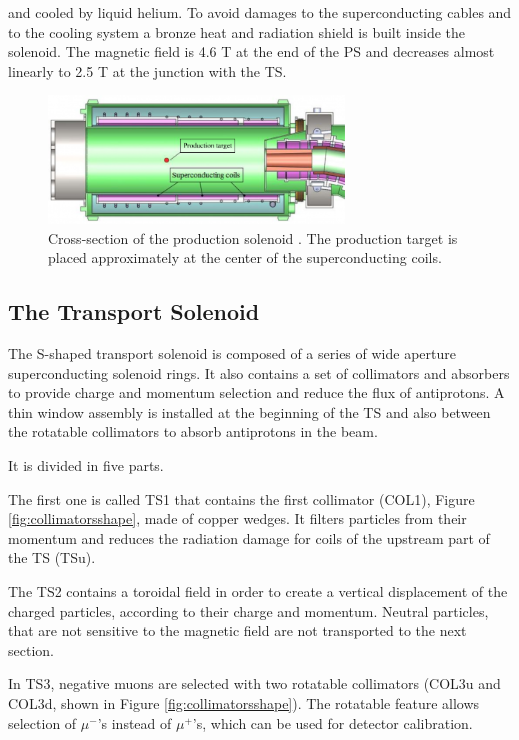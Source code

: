 and cooled by liquid helium. To avoid damages to the superconducting cables and
to the cooling system a bronze heat and radiation shield is built inside the solenoid.
The magnetic field is 4.6 T at the end of the PS and decreases almost linearly to 2.5 T at the
junction with the TS.
\begin{figure}[!h]
    \centering
    \includegraphics[width =0.7\textwidth]{figures/png/800px-Production_solenoid.png}
    \caption[The cross-section of the production solenoid.]{Cross-section of the production solenoid \cite{6376120}.
    The production target is placed approximately at the center of the superconducting coils.}
    \label{fig:PS}
    \end{figure}
\subsection{The Transport Solenoid}
The S-shaped transport solenoid is composed of a series of wide aperture superconducting
solenoid rings. It also contains a set of collimators and absorbers to provide charge and 
momentum selection and reduce the flux of antiprotons.
A thin window assembly is installed at the 
beginning of the TS and also between the rotatable collimators to absorb antiprotons in 
the beam. 

It is divided in five parts. 

The first one is called TS1 that contains the first collimator (COL1), 
Figure \ref{fig:collimatorsshape}, made of copper wedges. 
It filters particles from their momentum and reduces the radiation damage for coils of the 
upstream part of the TS (TSu). 

The TS2 contains a toroidal field in order to create a 
vertical displacement of the charged particles,
according to their charge and momentum.
Neutral particles, that are not sensitive to the magnetic 
field are not transported to the next section.

In TS3, negative muons are selected with two rotatable collimators (COL3u and COL3d, 
shown in Figure \ref{fig:collimatorsshape}). 
The rotatable feature allows selection of $\mu^-$'s instead of $\mu^+$'s, which can 
be used for detector calibration. 

